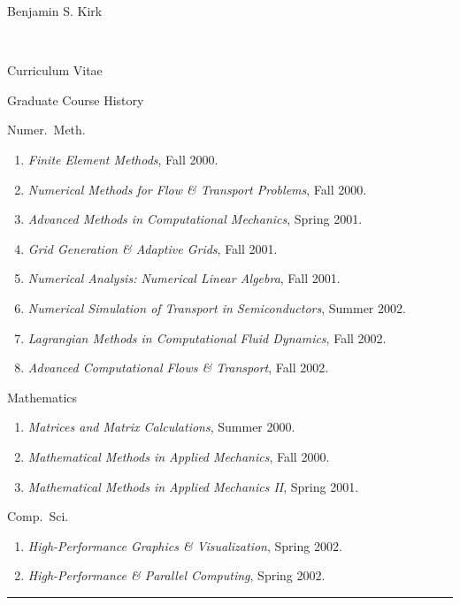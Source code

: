 \documentclass[10pt]{report}
\begin{document}
\begin{cv}{\centerline{\Large Benjamin S. Kirk}\\
    \centerline{\large Curriculum Vitae}}
\begin{cvlist}{Graduate Course History}
      \vspace{.5em}
      \item[Numer.\ Meth.]
	\begin{enumerate}
	  \item \emph{Finite Element Methods}, Fall 2000.
	  \item \emph{Numerical Methods for Flow \& Transport Problems}, Fall 2000.
	  \item \emph{Advanced Methods in Computational Mechanics}, Spring 2001.
	  \item \emph{Grid Generation \& Adaptive Grids}, Fall 2001.
	  \item \emph{Numerical Analysis: Numerical Linear Algebra}, Fall 2001.
	  \item \emph{Numerical Simulation of Transport in Semiconductors}, Summer 2002.
	  \item \emph{Lagrangian Methods in Computational Fluid Dynamics}, Fall 2002.
	  \item \emph{Advanced Computational Flows \& Transport}, Fall 2002.	  
	\end{enumerate}
	
      \vspace{.5em}
      \item[Mathematics]
	
	\begin{enumerate}
  	  \item \emph{Matrices and Matrix Calculations}, Summer 2000.
	  \item \emph{Mathematical Methods in Applied Mechanics}, Fall 2000.
	  \item \emph{Mathematical Methods in Applied Mechanics II}, Spring 2001.
	\end{enumerate}
	
      \vspace{.5em}
      \item[Comp.\ Sci.]
	
	\begin{enumerate}
	  \item \emph{High-Performance Graphics \& Visualization}, Spring 2002.
	  \item \emph{High-Performance \& Parallel Computing}, Spring 2002.      
	\end{enumerate}
  \end{cvlist}
  


{\hfill \hrule\hfill\vspace{.1mm} \\}
\end{cv}
\end{document}
